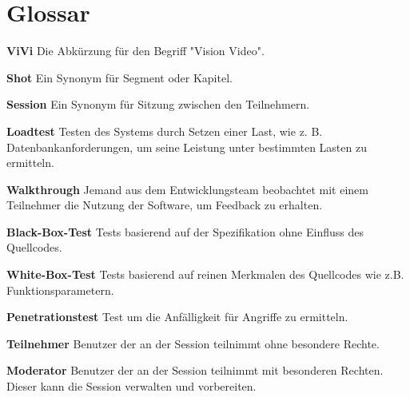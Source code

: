 \section{Glossar}

	\begin{description}
	\item{\textbf{ViVi}} Die Abkürzung für den Begriff "Vision Video".
	\end{description}

	\begin{description}
	\item{\textbf{Shot}} Ein Synonym für Segment oder Kapitel.
	\end{description}
	
	\begin{description}
	\item{\textbf{Session}} Ein Synonym für Sitzung zwischen den Teilnehmern.
	\end{description}

	\begin{description}
	\item{\textbf{Loadtest}} Testen des Systems durch Setzen einer Last, wie z. B. Datenbankanforderungen, um seine Leistung unter bestimmten Lasten zu ermitteln.
	\end{description}
	
	\begin{description}
    \item{\textbf{Walkthrough}} Jemand aus dem Entwicklungsteam beobachtet mit einem Teilnehmer die Nutzung der Software, um Feedback zu erhalten.
    \end{description}
    
    \begin{description}
    \item{\textbf{Black-Box-Test}} Tests basierend auf der Spezifikation ohne Einfluss des Quellcodes.
    \end{description}
    
    \begin{description}
    \item{\textbf{White-Box-Test}} Tests basierend auf reinen Merkmalen des Quellcodes wie z.B. 
    Funktionsparametern.
    \end{description}
    
    \begin{description}
    \item{\textbf{Penetrationstest}} Test um die Anfälligkeit für Angriffe zu ermitteln.
    \end{description}
    
    \begin{description}
    \item{\textbf{Teilnehmer}} Benutzer der an der Session teilnimmt ohne besondere Rechte.
    \end{description}
    
     \begin{description}
    \item{\textbf{Moderator}} Benutzer der an der Session teilnimmt mit besonderen Rechten. Dieser kann die Session verwalten und vorbereiten.
    \end{description}
    
    
 
